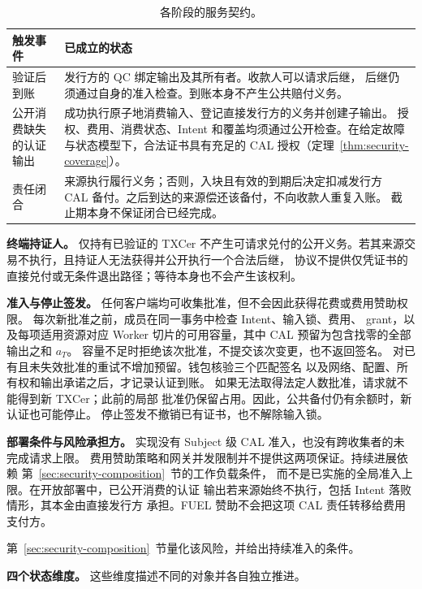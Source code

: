 \begin{table}[!t]
\caption{各阶段的服务契约。}
\label{tab:model-contract}
\centering\small
\begin{tabular}{@{}>{\raggedright\arraybackslash}p{}>{\raggedright\arraybackslash}p{}@{}}
\toprule
触发事件 & 已成立的状态 \\
\midrule
验证后到账 &
发行方的 QC 绑定输出及其所有者。收款人可以请求后继，
后继仍须通过自身的准入检查。到账本身不产生公共赔付义务。 \\
公开消费缺失的认证输出 &
成功执行原子地消费输入、登记直接发行方的义务并创建子输出。
授权、费用、消费状态、Intent 和覆盖均须通过公开检查。在给定故障与状态模型下，合法证书具有充足的 CAL 授权（定理~\ref{thm:security-coverage}）。 \\
责任闭合 &
来源执行履行义务；否则，入块且有效的到期后决定扣减发行方
CAL 备付。之后到达的来源偿还该备付，不向收款人重复入账。
截止期本身不保证闭合已经完成。 \\
\bottomrule
\end{tabular}
\end{table}

\noindent\textbf{终端持证人。}
仅持有已验证的 TXCer 不产生可请求兑付的公开义务。若其来源交易不执行，且持证人无法获得并公开执行一个合法后继，
协议不提供仅凭证书的直接兑付或无条件退出路径；等待本身也不会产生该权利。

\noindent\textbf{准入与停止签发。}
任何客户端均可收集批准，但不会因此获得花费或费用赞助权限。
每次新批准之前，成员在同一事务中检查 Intent、输入锁、费用、
grant，以及每项适用资源对应 Worker 切片的可用容量，其中 CAL 预留为包含找零的全部输出之和 $a_T$。
容量不足时拒绝该次批准，不提交该次变更，也不返回签名。
对已有且未失效批准的重试不增加预留。钱包核验三个匹配签名
以及网络、配置、所有权和输出承诺之后，才记录认证到账。
如果无法取得法定人数批准，请求就不能得到新 TXCer；此前的局部
批准仍保留占用。因此，公共备付仍有余额时，新认证也可能停止。
停止签发不撤销已有证书，也不解除输入锁。

\noindent\textbf{部署条件与风险承担方。}
实现没有 Subject 级 CAL 准入，也没有跨收集者的未完成请求上限。
费用赞助策略和网关并发限制并不提供这两项保证。持续进展依赖
第~\ref{sec:security-composition}~节的工作负载条件，
而不是已实施的全局准入上限。在开放部署中，已公开消费的认证
输出若来源始终不执行，包括 Intent 落败情形，其本金由直接发行方
承担。FUEL 赞助不会把这项 CAL 责任转移给费用支付方。

第~\ref{sec:security-composition}~节量化该风险，并给出持续准入的条件。


\noindent\textbf{四个状态维度。}
这些维度描述不同的对象并各自独立推进。

